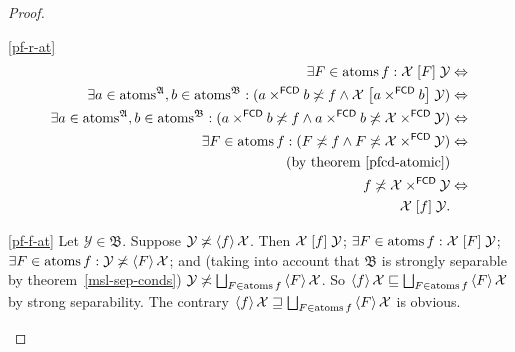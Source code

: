 \begin{proof}
~
\begin{widedisorder}
\item [{\ref{pf-r-at}}] ~
\begin{align*}
\exists F\in\operatorname{atoms} f:\mathcal{X}\mathrel{\left[F\right]}\mathcal{Y} & \Leftrightarrow\\
\exists a\in\operatorname{atoms}^{\mathfrak{A}},b\in\operatorname{atoms}^{\mathfrak{B}}:(a\times^{\mathsf{FCD}}b\not\asymp f\land\mathcal{X}\mathrel{\left[a\times^{\mathsf{FCD}}b\right]}\mathcal{Y}) & \Leftrightarrow\\
\exists a\in\operatorname{atoms}^{\mathfrak{A}},b\in\operatorname{atoms}^{\mathfrak{B}}:(a\times^{\mathsf{FCD}}b\not\asymp f\land a\times^{\mathsf{FCD}}b\not\asymp\mathcal{X}\times^{\mathsf{FCD}}\mathcal{Y}) & \Leftrightarrow\\
\exists F\in\operatorname{atoms} f:(F\not\asymp f\land F\not\asymp\mathcal{X}\times^{\mathsf{FCD}}\mathcal{Y}) & \Leftrightarrow\\
\text{(by theorem~\ref{pfcd-atomic})}\\
f\not\asymp\mathcal{X}\times^{\mathsf{FCD}}\mathcal{Y} & \Leftrightarrow\\
\mathcal{X}\mathrel{\left[f\right]}\mathcal{Y}.
\end{align*}

\item [{\ref{pf-f-at}}] Let $\mathcal{Y}\in\mathfrak{B}$. Suppose
$\mathcal{Y}\not\asymp\left\langle f\right\rangle\mathcal{X}$. Then $\mathcal{X}\mathrel{\left[f\right]}\mathcal{Y}$;
$\exists F\in\operatorname{atoms} f:\mathcal{X}\mathrel{\left[F\right]}\mathcal{Y}$; $\exists F\in\operatorname{atoms} f:\mathcal{Y}\not\asymp\left\langle F\right\rangle\mathcal{X}$;
and (taking into account that $\mathfrak{B}$ is strongly separable by theorem~\ref{msl-sep-conds})
$\mathcal{Y}\nasymp\bigsqcup_{F\in\atoms f}\supfun F\mathcal{X}$.
So $\supfun f\mathcal{X}\sqsubseteq\bigsqcup_{F\in\atoms f}\supfun F\mathcal{X}$ by strong separability.
The contrary $\supfun f\mathcal{X}\sqsupseteq\bigsqcup_{F\in\atoms f}\supfun F\mathcal{X}$
is obvious.
\end{widedisorder}
\end{proof}

